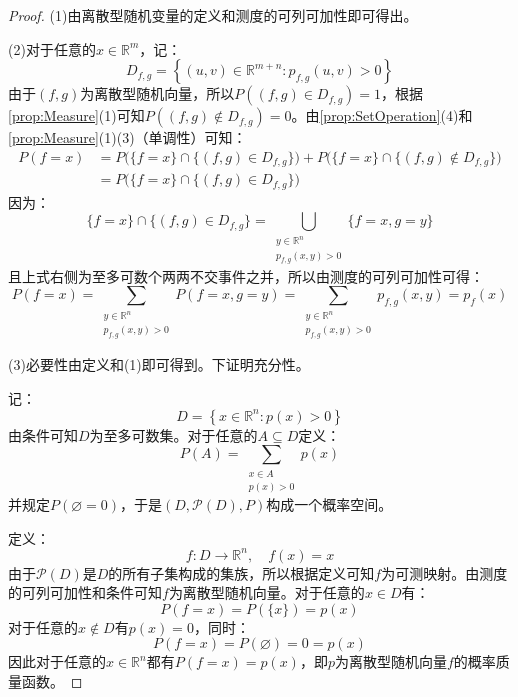 \begin{proof}
	(1)由离散型随机变量的定义和测度的可列可加性即可得出。\par
	(2)对于任意的$x\in\mathbb{R}^m$，记：
	\begin{equation*}
		D_{f,g}=\left\{(u,v)\in\mathbb{R}^{m+n}:p_{f,g}(u,v)>0\right\}
	\end{equation*}
	由于$(f,g)$为离散型随机向量，所以$P((f,g)\in D_{f,g})=1$，根据\cref{prop:Measure}(1)可知$P((f,g)\notin D_{f,g})=0$。由\cref{prop:SetOperation}(4)和\cref{prop:Measure}(1)(3)（单调性）可知：
	\begin{align*}
		P(f=x)&=P\Big(\{f=x\}\cap\{(f,g)\in D_{f,g}\}\Big)+P\Big(\{f=x\}\cap\{(f,g)\notin D_{f,g}\}\Big) \\
		&=P\Big(\{f=x\}\cap\{(f,g)\in D_{f,g}\}\Big)
	\end{align*}
	因为：
	\begin{equation*}
		\{f=x\}\cap\{(f,g)\in D_{f,g}\}=\bigcup_{\substack{y\in\mathbb{R}^n\\p_{f,g}(x,y)>0}}\{f=x,g=y\}
	\end{equation*}
	且上式右侧为至多可数个两两不交事件之并，所以由测度的可列可加性可得：
	\begin{equation*}
		P(f=x)=\sum_{\substack{y\in\mathbb{R}^n\\p_{f,g}(x,y)>0}}P(f=x,g=y)=\sum_{\substack{y\in\mathbb{R}^n\\p_{f,g}(x,y)>0}}p_{f,g}(x,y)=p_f(x)
	\end{equation*}\par
	(3)必要性由定义和(1)即可得到。下证明充分性。\par
	记：
	\begin{equation*}
		D=\left\{x\in\mathbb{R}^n:p(x)>0\right\}
	\end{equation*}
	由条件可知$D$为至多可数集。对于任意的$A\subseteq D$定义：
	\begin{equation*}
		P(A)=\sum_{\substack{x\in A\\p(x)>0}}p(x)
	\end{equation*}
	并规定$P(\varnothing=0)$，于是$(D,\mathscr{P}(D),P)$构成一个概率空间。\par
	定义：
	\begin{equation*}
		f:D\to\mathbb{R}^{n},\quad f(x)=x
	\end{equation*}
	由于$\mathscr{P}(D)$是$D$的所有子集构成的集族，所以根据定义可知$f$为可测映射。由测度的可列可加性和条件可知$f$为离散型随机向量。对于任意的$x\in D$有：
	\begin{equation*}
		P(f=x)=P(\{x\})=p(x)
	\end{equation*}
	对于任意的$x\notin D$有$p(x)=0$，同时：
	\begin{equation*}
		P(f=x)=P(\varnothing)=0=p(x)
	\end{equation*}
	因此对于任意的$x\in\mathbb{R}^n$都有$P(f=x)=p(x)$，即$p$为离散型随机向量$f$的概率质量函数。
\end{proof}